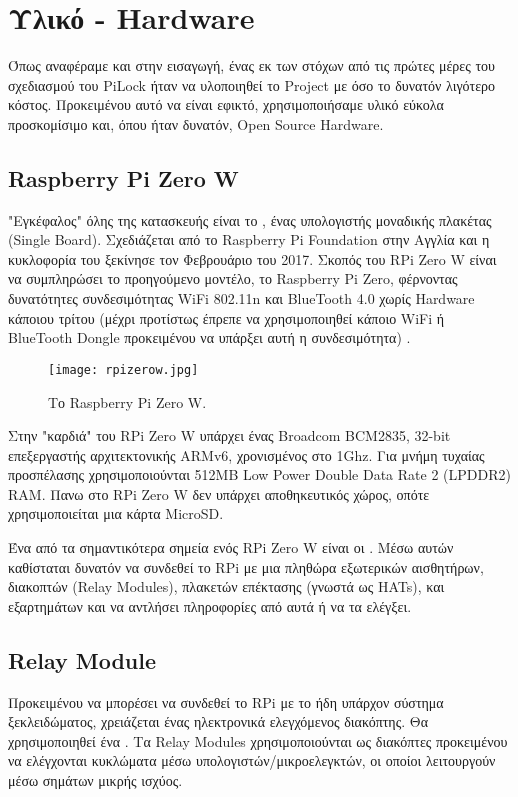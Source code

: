 \section{Υλικό - Hardware}
	\label{sec:hardw}
	Όπως αναφέραμε και στην εισαγωγή, ένας εκ των στόχων από τις πρώτες μέρες του σχεδιασμού του PiLock ήταν να υλοποιηθεί το Project με όσο το δυνατόν λιγότερο κόστος. Προκειμένου αυτό να είναι εφικτό, χρησιμοποιήσαμε υλικό εύκολα προσκομίσιμο και, όπου ήταν δυνατόν, Open Source Hardware.

	\subsection{Raspberry Pi Zero W}
		"Εγκέφαλος" όλης της κατασκευής είναι το , ένας υπολογιστής μοναδικής πλακέτας (Single Board). Σχεδιάζεται από το Raspberry Pi Foundation στην Αγγλία και η κυκλοφορία του ξεκίνησε τον Φεβρουάριο του 2017. Σκοπός του RPi Zero W είναι να συμπληρώσει το προηγούμενο μοντέλο, το Raspberry Pi Zero, φέρνοντας δυνατότητες συνδεσιμότητας WiFi 802.11n και BlueTooth 4.0 χωρίς Hardware κάποιου τρίτου (μέχρι προτίστως έπρεπε να χρησιμοποιηθεί κάποιο WiFi ή BlueTooth Dongle προκειμένου να υπάρξει αυτή η συνδεσιμότητα) .

		\begin{figure}[h]
			\centering
				\texttt{[image: rpizerow.jpg]}
			\caption{Το Raspberry Pi Zero W.}
		\end{figure}

		Στην "καρδιά" του RPi Zero W υπάρχει ένας Broadcom BCM2835, 32-bit επεξεργαστής αρχιτεκτονικής ARMv6, χρονισμένος στο 1Ghz. Για μνήμη τυχαίας προσπέλασης χρησιμοποιούνται 512MB Low Power Double Data Rate 2 (LPDDR2) RAM. Πανω στο RPi Zero W δεν υπάρχει αποθηκευτικός χώρος, οπότε χρησιμοποιείται μια κάρτα MicroSD. 

		Ένα από τα σημαντικότερα σημεία ενός RPi Zero W είναι οι \textbf{}. Μέσω αυτών καθίσταται δυνατόν να συνδεθεί το RPi με μια πληθώρα εξωτερικών αισθητήρων, διακοπτών (Relay Modules), πλακετών επέκτασης (γνωστά ως HATs), και εξαρτημάτων και να αντλήσει πληροφορίες από αυτά ή να τα ελέγξει.

	\subsection{Relay Module}
		\label{sub:relay}
		Προκειμένου να μπορέσει να συνδεθεί το RPi με το ήδη υπάρχον σύστημα ξεκλειδώματος, χρειάζεται ένας ηλεκτρονικά ελεγχόμενος διακόπτης. Θα χρησιμοποιηθεί ένα \textbf{}. Τα Relay Modules χρησιμοποιούνται ως διακόπτες προκειμένου να ελέγχονται κυκλώματα μέσω υπολογιστών/μικροελεγκτών, οι οποίοι λειτουργούν μέσω σημάτων μικρής ισχύος.

